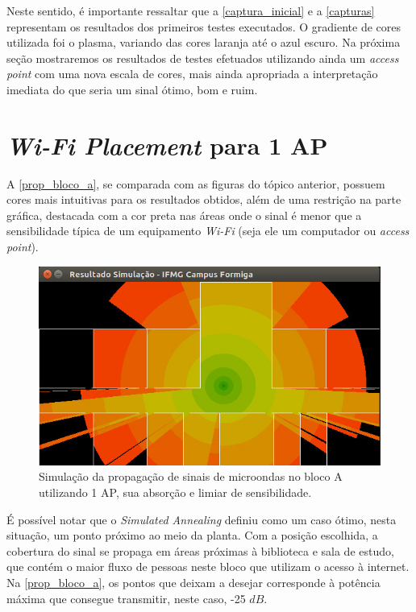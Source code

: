 \documentclass[
	12pt,				%
	twoside,			%
	a4paper,			%
	english,			%
	french,				%
	spanish,			%
	brazil				%
	]{abntex2}
\begin{document}
Neste sentido, é importante ressaltar que a \autoref{captura_inicial} e
a \autoref{capturas} representam os resultados dos primeiros testes
executados. O gradiente de cores utilizada foi o plasma, variando das
cores laranja até o azul escuro. Na próxima seção mostraremos os
resultados de testes efetuados utilizando ainda um \emph{access point}
com uma nova escala de cores, mais ainda apropriada a interpretação
imediata do que seria um sinal ótimo, bom e ruim.

\section{\texorpdfstring{\emph{Wi-Fi Placement} para 1
AP}{Wi-Fi Placement para 1 AP}}\label{wi-fi-placement-para-1-ap}

A \autoref{prop_bloco_a}, se comparada com as figuras do tópico
anterior, possuem cores mais intuitivas para os resultados obtidos, além
de uma restrição na parte gráfica, destacada com a cor preta nas áreas
onde o sinal é menor que a sensibilidade típica de um equipamento
\emph{Wi-Fi} (seja ele um computador ou \emph{access point}).

\begin{figure}[ht]
    \caption{\label{prop_bloco_a} Simulação da propagação de sinais de microondas no bloco A utilizando 1 AP, sua absorção e limiar de sensibilidade.}
    \begin{center}
        \includegraphics[scale=0.7]{imagens/prop-bloco-a-2.jpg}
    \end{center}
\end{figure}

É possível notar que o \emph{Simulated Annealing} definiu como um caso
ótimo, nesta situação, um ponto próximo ao meio da planta. Com a posição
escolhida, a cobertura do sinal se propaga em áreas próximas à
biblioteca e sala de estudo, que contém o maior fluxo de pessoas neste
bloco que utilizam o acesso à internet. Na \autoref{prop_bloco_a}, os
pontos que deixam a desejar corresponde à potência máxima que consegue
transmitir, neste caso, -25 \(dB\).
\end{document}
